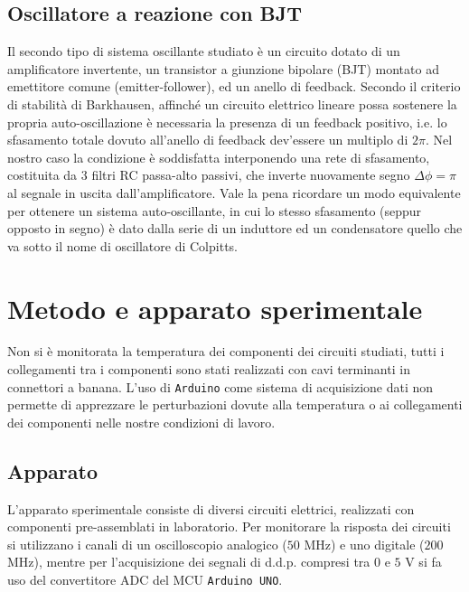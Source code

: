 \documentclass{article}[a4paper, oneside, 11pt]
\begin{document}
\subsection{Oscillatore a reazione con BJT}
Il secondo tipo di sistema oscillante studiato è un circuito dotato di
un amplificatore invertente, un transistor a giunzione bipolare (BJT) montato
ad emettitore comune (emitter-follower), ed un anello di feedback.
Secondo il criterio di stabilità di Barkhausen, affinché un circuito
elettrico lineare possa sostenere la propria auto-oscillazione è necessaria
la presenza di un feedback positivo, i.e. lo sfasamento totale dovuto
all'anello di feedback dev'essere un multiplo di $2\pi$. Nel nostro caso la
condizione è soddisfatta interponendo una rete di sfasamento, costituita da
3 filtri RC passa-alto passivi, che inverte nuovamente segno
$\Delta \phi = \pi$
al segnale in uscita dall'amplificatore. Vale la pena ricordare un
modo equivalente per ottenere un sistema auto-oscillante, in cui lo stesso
sfasamento (seppur opposto in segno) è dato dalla serie di un induttore ed
un condensatore quello che va sotto il nome di oscillatore di Colpitts.
\section{Metodo e apparato sperimentale}
Non si è monitorata la temperatura dei componenti dei circuiti studiati,
tutti i collegamenti tra i componenti sono stati realizzati con cavi
terminanti in connettori a banana. L'uso di \verb+Arduino+\cite{arduino}
come sistema di acquisizione dati non permette di apprezzare le perturbazioni
dovute alla temperatura o ai collegamenti dei componenti nelle nostre
condizioni di lavoro.
\subsection{Apparato}
L'apparato sperimentale consiste di diversi circuiti elettrici,
realizzati con componenti pre-assemblati in laboratorio. Per
monitorare la risposta dei circuiti si utilizzano i canali di un oscilloscopio
analogico ($50$ MHz) e uno digitale ($200$ MHz), mentre per l'acquisizione dei
segnali di d.d.p. compresi tra $0$ e $5$ V si fa uso del convertitore ADC
del MCU \verb+Arduino UNO+.
\end{document}
